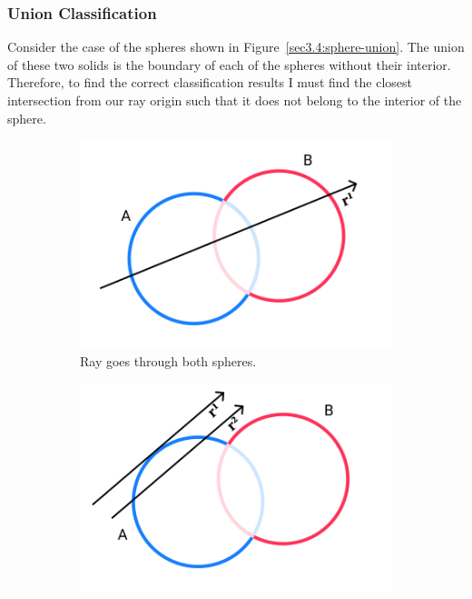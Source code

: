 \documentclass[a4paper,11pt,oneside]{article}
\begin{document}
\subsubsection{Union Classification}

Consider the case of the spheres shown in Figure~\ref{sec3.4:sphere-union}. The union of these two solids is the boundary of each of the spheres without their interior. Therefore, to find the correct classification results I must find the closest intersection from our ray origin such that it does not belong to the interior of the sphere.

\begin{figure}[ht]
	\centering
	\begin{subfigure}[b]{0.3\textwidth}
		\centering
		\includegraphics[width=\textwidth]{section4/4.1/union-case-1.png}
		\caption{Ray goes through both spheres.}
		\label{sec3.4:union-case1}
	\end{subfigure}
	\hfill
	\begin{subfigure}[b]{0.3\textwidth}
		\centering
		\includegraphics[width=\textwidth]{section4/4.1/union-case-3.png}

\end{subfigure}
\end{figure}
\end{document}
